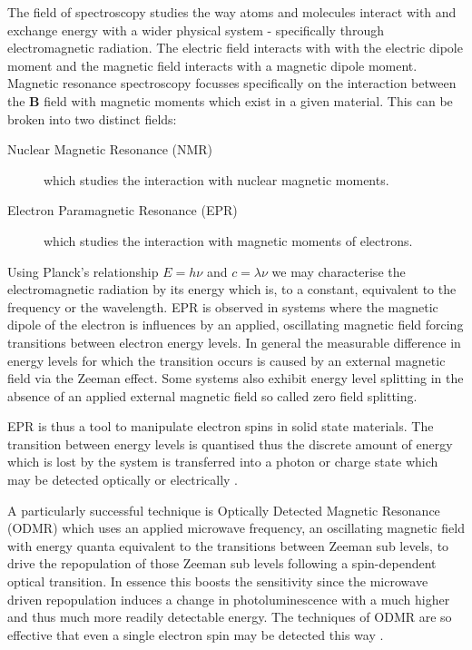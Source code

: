 The field of spectroscopy studies the way atoms and molecules interact with and exchange energy with a wider physical system - specifically through electromagnetic radiation. The electric field interacts with with the electric dipole moment and the magnetic field interacts with a magnetic dipole moment.
Magnetic resonance spectroscopy focusses specifically on the interaction between the $\mathbf{B}$ field with magnetic moments which exist in a given material. This can be broken into two distinct fields:

\begin{description}
	\item [Nuclear Magnetic Resonance (NMR)] which studies the interaction with nuclear magnetic moments.
	\item [Electron Paramagnetic Resonance (EPR)] which studies the interaction with magnetic moments of electrons.
\end{description}

Using Planck's relationship $E = h \nu$  and $c = \lambda \nu$ we may characterise the electromagnetic radiation by its energy which is, to a constant, equivalent to the frequency or the wavelength. EPR is observed in systems where the magnetic dipole of the electron is influences by an applied, oscillating magnetic field forcing transitions between electron energy levels. In general the measurable difference in energy levels for which the transition occurs is caused by an external magnetic field via the Zeeman effect. Some systems also exhibit energy level splitting in the absence of an applied external magnetic field so called zero field splitting.

EPR is thus a tool to manipulate electron spins in solid state materials. The transition between energy levels is quantised thus the discrete amount of energy which is lost by the system is transferred into a photon or charge state which may be detected optically or electrically \cite{carrington1967introduction}.

A particularly successful technique is Optically Detected Magnetic Resonance (ODMR) which uses an applied microwave frequency, an oscillating magnetic field with energy quanta equivalent to the transitions between Zeeman sub levels, to drive the repopulation of those Zeeman sub levels following a spin-dependent optical transition.
In essence this boosts the sensitivity since the microwave driven repopulation induces a change in photoluminescence with a much higher and thus much more readily detectable energy. The techniques of ODMR are so effective that even a single electron spin may be detected this way \cite{Khler1993}.



